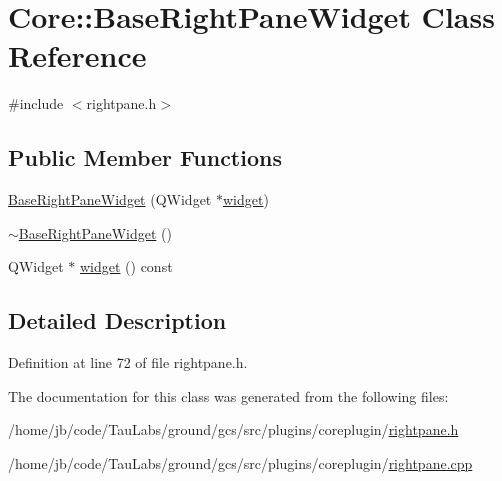 \hypertarget{class_core_1_1_base_right_pane_widget}{\section{\-Core\-:\-:\-Base\-Right\-Pane\-Widget \-Class \-Reference}
\label{class_core_1_1_base_right_pane_widget}
}


{\ttfamily \#include $<$rightpane.\-h$>$}

\subsection*{\-Public \-Member \-Functions}
\begin{DoxyCompactItemize}
\item 
\hyperlink{group___core_plugin_ga648a6f106ea2b26a6ea483a1d880c8e0}{\-Base\-Right\-Pane\-Widget} (\-Q\-Widget $\ast$\hyperlink{group___core_plugin_ga232e880cc9c5025c590538ff61108f5f}{widget})
\item 
\hyperlink{group___core_plugin_gab6b58a6a058db3435d20951bbe98090e}{$\sim$\-Base\-Right\-Pane\-Widget} ()
\item 
\-Q\-Widget $\ast$ \hyperlink{group___core_plugin_ga232e880cc9c5025c590538ff61108f5f}{widget} () const 
\end{DoxyCompactItemize}


\subsection{\-Detailed \-Description}


\-Definition at line 72 of file rightpane.\-h.



\-The documentation for this class was generated from the following files\-:\begin{DoxyCompactItemize}
\item 
/home/jb/code/\-Tau\-Labs/ground/gcs/src/plugins/coreplugin/\hyperlink{rightpane_8h}{rightpane.\-h}\item 
/home/jb/code/\-Tau\-Labs/ground/gcs/src/plugins/coreplugin/\hyperlink{rightpane_8cpp}{rightpane.\-cpp}\end{DoxyCompactItemize}
